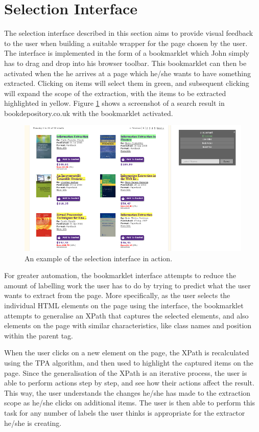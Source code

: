 \section{Selection Interface}
The selection interface described in this section aims to provide visual feedback to the user
when building a suitable wrapper for the page chosen by the user. The interface is implemented
in the form of a bookmarklet which John simply has to drag and drop into his browser
toolbar. This bookmarklet can then be activated when the he arrives at a page which he/she wants
to have something extracted. Clicking on items will select them in green, and subsequent clicking
will expand the scope of the extraction, with the items to be extracted highlighted in yellow.
Figure \ref{fig:selection_example} shows a screenshot of a search result in bookdepository.co.uk
with the bookmarklet activated.

\begin{figure}[htbp]
\centering
\includegraphics[scale=0.43]{selection_example.png} 
\caption{An example of the selection interface in action.}
\label{fig:selection_example}
\end{figure}


For greater automation, the bookmarklet interface attempts to reduce the amount of labelling
work the user has to do by trying to predict what the user wants to extract from the page.
More specifically, as the user selects the individual HTML elements on the page using the interface,
the bookmarklet attempts to generalise an XPath that captures the selected elements,
and also elements on the page with similar characteristics, like class names and position
within the parent tag.


When the user clicks on a new element on the page,
the XPath is recalculated using the TPA algorithm, and then used to highlight the captured items on the page.
Since the generalisation of the XPath is an iterative process, the user is able to perform
actions step by step, and see how their actions affect the result.
This way, the user understands the changes he/she has made to the extraction scope as he/she
clicks on additional items. The user is then able to perform this task for any number of labels
the user thinks is appropriate for the extractor he/she is creating.

